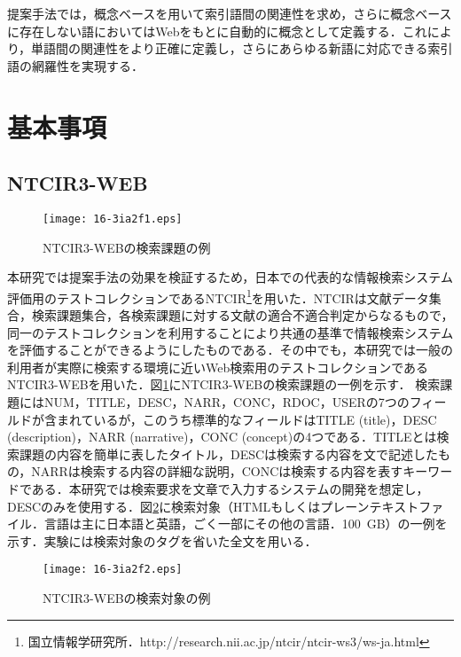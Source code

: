 \documentclass[japanese]{jnlp_1.4}
\begin{document}
提案手法では，概念ベースを用いて索引語間の関連性を求め，さらに概念ベースに存在しない語においてはWebをもとに自動的に概念として定義する．これにより，単語間の関連性をより正確に定義し，さらにあらゆる新語に対応できる索引語の網羅性を実現する．


\section{基本事項}

\subsection{NTCIR3-WEB}

\begin{figure}[b]
\begin{center}
\texttt{[image: 16-3ia2f1.eps]}
\caption{NTCIR3-WEBの検索課題の例}
\label{fig:example_of_problem}
\end{center}
\end{figure}

本研究では提案手法の効果を検証するため，日本での代表的な情報検索システム評価用のテストコレクションであるNTCIR\footnote{国立情報学研究所．http://research.nii.ac.jp/ntcir/ntcir-ws3/ws-ja.html}を用いた．NTCIRは文献データ集合，検索課題集合，各検索課題に対する文献の適合不適合判定からなるもので，同一のテストコレクションを利用することにより共通の基準で情報検索システムを評価することができるようにしたものである．その中でも，本研究では一般の利用者が実際に検索する環境に近いWeb検索用のテストコレクションであるNTCIR3-WEBを用いた．図\ref{fig:example_of_problem}にNTCIR3-WEBの検索課題の一例を示す．
検索課題にはNUM，TITLE，DESC，NARR，CONC，RDOC，USERの7つのフィールドが含まれているが，このうち標準的なフィールドはTITLE (title)，DESC (description)，NARR (narrative)，CONC (concept)の4つである．TITLEとは検索課題の内容を簡単に表したタイトル，DESCは検索する内容を文で記述したもの，NARRは検索する内容の詳細な説明，CONCは検索する内容を表すキーワードである．本研究では検索要求を文章で入力するシステムの開発を想定し，DESCのみを使用する．図\ref{fig:example_of_object}に検索対象（HTMLもしくはプレーンテキストファイル．言語は主に日本語と英語，ごく一部にその他の言語．100~GB）の一例を示す．実験には検索対象のタグを省いた全文を用いる．

\begin{figure}[t]
\begin{center}
\texttt{[image: 16-3ia2f2.eps]}
\caption{NTCIR3-WEBの検索対象の例}
\label{fig:example_of_object}
\end{center}
\end{figure}
\end{document}
